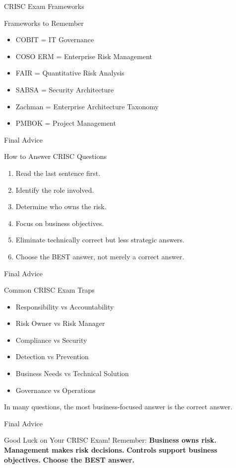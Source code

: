 \documentclass{beamer}
\begin{document}
\begin{frame}{CRISC Exam Frameworks} \begin{block}{Frameworks to Remember} \begin{itemize} \item COBIT = IT Governance \item COSO ERM = Enterprise Risk Management \item FAIR = Quantitative Risk Analysis \item SABSA = Security Architecture \item Zachman = Enterprise Architecture Taxonomy \item PMBOK = Project Management \end{itemize} \end{block} \end{frame} \begin{frame}{Final Advice} \begin{block}{How to Answer CRISC Questions} \begin{enumerate} \item Read the last sentence first. \item Identify the role involved. \item Determine who owns the risk. \item Focus on business objectives. \item Eliminate technically correct but less strategic answers. \item Choose the BEST answer, not merely a correct answer. \end{enumerate} \end{block} \end{frame} \begin{frame}{Final Advice} \begin{block}{Common CRISC Exam Traps} \begin{itemize} \item Responsibility vs Accountability \item Risk Owner vs Risk Manager \item Compliance vs Security \item Detection vs Prevention \item Business Needs vs Technical Solution \item Governance vs Operations \end{itemize} In many questions, the most business-focused answer is the correct answer. \end{block} \end{frame} \begin{frame}{Final Advice} \begin{center} \Huge Good Luck on Your CRISC Exam! \vspace{1cm} \Large Remember: \textbf{Business owns risk.} \textbf{Management makes risk decisions.} \textbf{Controls support business objectives.} \textbf{Choose the BEST answer.} \end{center} \end{frame}
	
\end{document}
